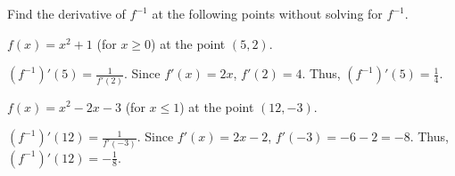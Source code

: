 \documentclass[nooutcomes]{ximera}
\renewenvironment{freeResponse}{
\ifhandout\setbox0\vbox\bgroup\else
\begin{trivlist}\item[\hskip \labelsep\bfseries Solution:\hspace{2ex}]
\fi}
{\ifhandout\egroup\else
\end{trivlist}
\fi}
\begin{document}
\begin{problem}
Find the derivative of $f^{-1}$ at the following points without solving for $f^{-1}$.
	\begin{enumerate}
	
	\item  $f(x) = x^2 + 1$ (for $x \geq 0$) at the point $(5,2)$.  
		\begin{freeResponse}
		$(f^{-1})'(5) = \frac{1}{f'(2)}$.  Since $f'(x) = 2x$, $f'(2) = 4$.  Thus, $(f^{-1})'(5) = \frac{1}{4}$.  
		\end{freeResponse}

	\item  $f(x) = x^2 - 2x - 3$ (for $x \leq 1$) at the point $(12, -3)$.  
		\begin{freeResponse}
		$(f^{-1})'(12) = \frac{1}{f'(-3)}$.  Since $f'(x) = 2x - 2$, $f'(-3) = -6 - 2 = -8$.  Thus, $(f^{-1})'(12) = - \frac{1}{8}$. 
		\end{freeResponse}
	\end{enumerate}
\end{problem}
\end{document}
